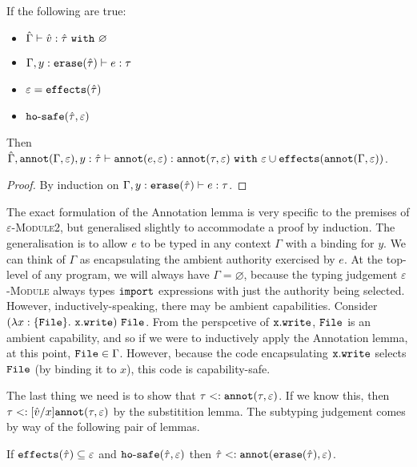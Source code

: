 \begin{lemma}[Annotation]
If the following are true:

\begin{itemize}
	\setlength\itemsep{-0.7em}
	\item $\hat \Gamma \vdash \hat v : \hat \tau~\mathtt{with}~ \varnothing$
	\item $\Gamma, y: \mathtt{erase}(\hat \tau) \vdash e: \tau$
	\item $\varepsilon = \mathtt{effects}(\hat \tau)$
	\item $\mathtt{ho \hbox{-} safe}(\hat \tau, \varepsilon)$
\end{itemize}

\noindent
Then $\hat \Gamma, \mathtt{annot}(\Gamma, \varepsilon), y: \hat \tau \vdash \mathtt{annot}(e, \varepsilon) : \mathtt{annot}(\tau, \varepsilon)~\mathtt{with}~ \varepsilon \cup \mathtt{effects}(\mathtt{annot}(\Gamma, \varepsilon))$.
\end{lemma}

\begin{proof}
By induction on $\Gamma, y: \mathtt{erase}(\hat \tau) \vdash e: \tau$.
\end{proof}

\noindent
The exact formulation of the Annotation lemma is very specific to the premises of \textsc{$\varepsilon$-Module2}, but generalised slightly to accommodate a proof by induction. The generalisation is to allow $e$ to be typed in any context $\Gamma$ with a binding for $y$. We can think of $\Gamma$ as encapsulating the ambient authority exercised by $e$. At the top-level of any program, we will always have $\Gamma = \varnothing$, because the typing judgement \textsc{$\varepsilon$-Module} always types $\mathtt{import}$ expressions with just the authority being selected. However, inductively-speaking, there may be ambient capabilities. Consider $(\lambda x: \{ \mathtt{File} \}.~\mathtt{x.write})~\mathtt{File}$. From the perspcetive of $\mathtt{x.write}$, $\mathtt{File}$ is an ambient capability, and so if we were to inductively apply the Annotation lemma, at this point, $\mathtt{File} \in \Gamma$. However, because the code encapsulating $\mathtt{x.write}$ selects $\mathtt{File}$ (by binding it to $x$), this code is capability-safe.

The last thing we need is to show that $\tau <: \mathtt{annot}(\tau, \varepsilon)$. If we know this, then $\tau <: [\hat v/x]\mathtt{annot}(\tau, \varepsilon)$ by the substitition lemma. The subtyping judgement comes by way of the following pair of lemmas.

\begin{lemma}
If $\mathtt{effects}(\hat \tau) \subseteq \varepsilon$ and $\mathtt{ho \hbox{-} safe}(\hat \tau, \varepsilon)$ then $\hat \tau <: \mathtt{annot}(\mathtt{erase}(\hat \tau), \varepsilon)$.
\end{lemma}

